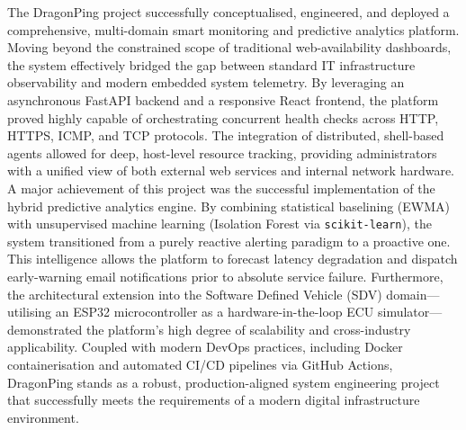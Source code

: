 \documentclass[12pt,a4paper,oneside]{report}
\begin{document}
\noindent The DragonPing project successfully conceptualised, engineered, and deployed a comprehensive, multi-domain smart monitoring and predictive analytics platform. Moving beyond the constrained scope of traditional web-availability dashboards, the system effectively bridged the gap between standard IT infrastructure observability and modern embedded system telemetry. By leveraging an asynchronous FastAPI backend and a responsive React frontend, the platform proved highly capable of orchestrating concurrent health checks across HTTP, HTTPS, ICMP, and TCP protocols. The integration of distributed, shell-based agents allowed for deep, host-level resource tracking, providing administrators with a unified view of both external web services and internal network hardware. A major achievement of this project was the successful implementation of the hybrid predictive analytics engine. By combining statistical baselining (EWMA) with unsupervised machine learning (Isolation Forest via \texttt{scikit-learn}), the system transitioned from a purely reactive alerting paradigm to a proactive one. This intelligence allows the platform to forecast latency degradation and dispatch early-warning email notifications prior to absolute service failure. Furthermore, the architectural extension into the Software Defined Vehicle (SDV) domain---utilising an ESP32 microcontroller as a hardware-in-the-loop ECU simulator---demonstrated the platform's high degree of scalability and cross-industry applicability. Coupled with modern DevOps practices, including Docker containerisation and automated CI/CD pipelines via GitHub Actions, DragonPing stands as a robust, production-aligned system engineering project that successfully meets the requirements of a modern digital infrastructure environment.
\end{document}

